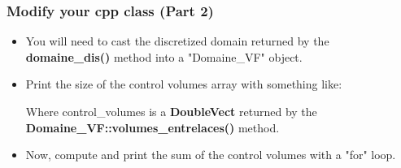 \documentclass[10pt, hyperref={unicode=true,pdfusetitle, bookmarks=true,bookmarksnumbered=false,bookmarksopen=false, breaklinks=false,pdfborder={0 0 1},backref=true,colorlinks=true,linkcolor=darkblue,pageanchor, urlcolor=darkblue}]{beamer}
\begin{document}
\begin{frame}
\frametitle{Modify your cpp class (Part 2)}
\begin{block}{}

\begin{itemize}
\item You will need to cast the discretized domain returned by the \textbf{domaine\_dis()} method into a "Domaine\_VF" object.

\item Print the size of the control volumes array with something like:
\begin{center}
\end{center}

Where control\_volumes is a \textbf{DoubleVect} returned by the \textbf{Domaine\_VF::volumes\_entrelaces()} method.
\item Now, compute and print the sum of the control volumes with a "for" loop.

\end{itemize}

\end{block}
\end{frame}
\end{document}
